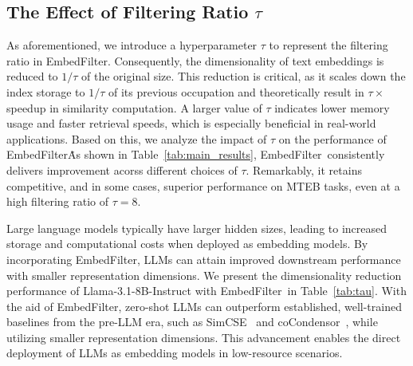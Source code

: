 \documentclass{llmxive}
\providecommand{\name}{EmbedFilter}
\begin{document}
\subsection{The Effect of Filtering Ratio \texorpdfstring{\(\tau\)}{...}}
As aforementioned, we introduce a hyperparameter \(\tau\) to represent the filtering ratio in \name.
Consequently, the dimensionality of text embeddings is reduced to \(1/\tau\) of the original size.
This reduction is critical, as it scales down the index storage to \(1/\tau\) of its previous occupation and theoretically result in \(\tau \times\) speedup in similarity computation.
A larger value of \(\tau\) indicates lower memory usage and faster retrieval speeds, which is especially beneficial in real-world applications.
Based on this, we analyze the impact of \(\tau\) on the performance of \name\.
As shown in Table~\ref{tab:main_results}, \name\ consistently delivers improvement acorss different choices of \(\tau\).
Remarkably, it retains competitive, and in some cases, superior performance on MTEB tasks, even at a high filtering ratio of \(\tau=8\).

Large language models typically have larger hidden sizes, leading to increased storage and computational costs when deployed as embedding models.
By incorporating \name, LLMs can attain improved downstream performance with smaller representation dimensions.
We present the dimensionality reduction performance of Llama-3.1-8B-Instruct with \name~in Table~\ref{tab:tau}.
With the aid of \name, zero-shot LLMs can outperform established, well-trained baselines from the pre-LLM era, such as SimCSE~\cite{simcse} and coCondensor~\cite{cocondensor}, while utilizing smaller representation dimensions.
This advancement enables the direct deployment of LLMs as embedding models in low-resource scenarios.
\end{document}
